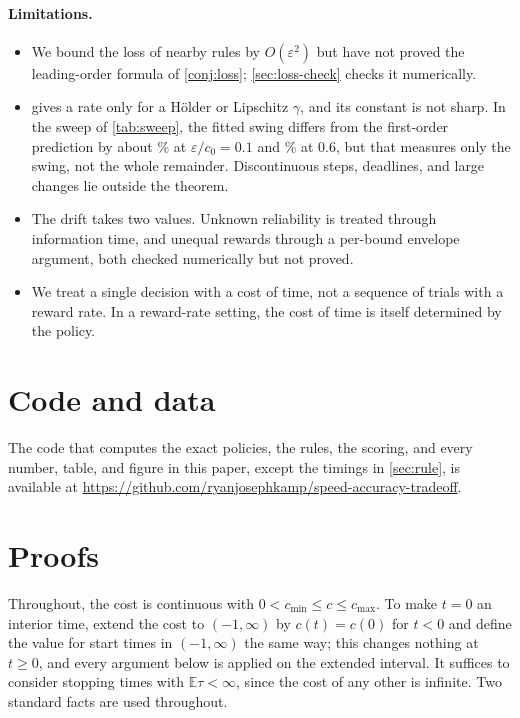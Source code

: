 \documentclass[11pt]{article}
\theoremstyle{definition}
\theoremstyle{remark}
\newcommand{\E}{\mathbb{E}}
\begin{document}
\paragraph{Limitations.}
\begin{itemize}
  \item We bound the loss of nearby rules by $O(\varepsilon^2)$ but have not proved the
    leading-order formula of \cref{conj:loss}; \cref{sec:loss-check} checks it numerically.
  \item {} gives a rate only for a Hölder or Lipschitz $\gamma$, and its constant
    is not sharp. In the sweep of \cref{tab:sweep}, the fitted swing differs from the first-order
    prediction by about \SweepSwingTenth\% at $\varepsilon/c_0 = 0.1$ and \SweepSwingSixTenths\% at
    0.6, but that measures only the swing, not the whole remainder. Discontinuous steps, deadlines,
    and large changes lie outside the theorem.
  \item The drift takes two values. Unknown reliability is treated through information time, and
    unequal rewards through a per-bound envelope argument, both checked numerically but not proved.
  \item We treat a single decision with a cost of time, not a sequence of trials with a reward
    rate. In a reward-rate setting, the cost of time is itself determined by the policy.
\end{itemize}

\section*{Code and data}
The code that computes the exact policies, the rules, the scoring, and every number, table, and
figure in this paper, except the timings in \cref{sec:rule}, is available at \url{https://github.com/ryanjosephkamp/speed-accuracy-tradeoff}.




\appendix

\section{Proofs}
\label{app:proofs}

Throughout, the cost is continuous with $0 < c_{\min} \le c \le c_{\max}$. To make $t = 0$ an
interior time, extend the cost to $(-1, \infty)$ by $c(t) = c(0)$ for $t < 0$ and define the value
for start times in $(-1, \infty)$ the same way; this changes nothing at $t \ge 0$, and every
argument below is applied on the extended interval. It suffices to consider stopping times with
$\E\tau < \infty$, since the cost of any other is infinite. Two standard facts are used throughout.
\end{document}
